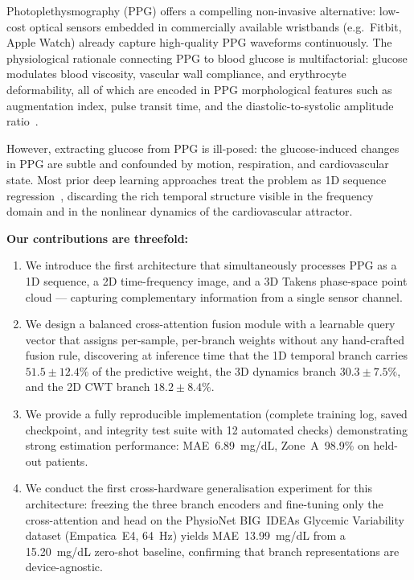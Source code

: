 \documentclass[conference]{IEEEtran}
\begin{document}
Photoplethysmography (PPG) offers a compelling non-invasive alternative:
low-cost optical sensors embedded in commercially available wristbands
(e.g.\ Fitbit, Apple Watch) already capture high-quality PPG waveforms
continuously.  The physiological rationale connecting PPG to blood glucose is
multifactorial: glucose modulates blood viscosity, vascular wall compliance, and
erythrocyte deformability, all of which are encoded in PPG morphological
features such as augmentation index, pulse transit time, and the
diastolic-to-systolic amplitude ratio~\cite{allen2007ppg}.

However, extracting glucose from PPG is ill-posed: the glucose-induced changes
in PPG are subtle and confounded by motion, respiration, and cardiovascular
state.  Most prior deep learning approaches treat the problem as 1D
sequence regression~\cite{hina2021noninvasive,dinh2022ppg}, discarding the
rich temporal structure visible in the frequency domain and in the
nonlinear dynamics of the cardiovascular attractor.

\textbf{Our contributions are threefold:}
\begin{enumerate}
  \item We introduce the first architecture that simultaneously processes PPG
        as a 1D sequence, a 2D time-frequency image, and a 3D Takens
        phase-space point cloud --- capturing complementary information from a
        single sensor channel.
  \item We design a balanced cross-attention fusion module with a learnable
        query vector that assigns per-sample, per-branch weights without any
        hand-crafted fusion rule, discovering at inference time that the 1D
        temporal branch carries $51.5\pm12.4\%$ of the predictive weight,
        the 3D dynamics branch $30.3\pm7.5\%$, and the 2D CWT
        branch $18.2\pm8.4\%$.
  \item We provide a fully reproducible implementation (complete training log,
        saved checkpoint, and integrity test suite with 12 automated checks)
        demonstrating strong estimation performance: MAE~6.89~mg/dL,
        Zone~A~98.9\% on held-out patients.
  \item We conduct the first cross-hardware generalisation experiment for
        this architecture: freezing the three branch encoders and fine-tuning
        only the cross-attention and head on the PhysioNet BIG~IDEAs
        Glycemic Variability dataset (Empatica~E4, 64~Hz) yields
        MAE~13.99~mg/dL from a 15.20~mg/dL zero-shot baseline, confirming
        that branch representations are device-agnostic.
\end{enumerate}
\end{document}
